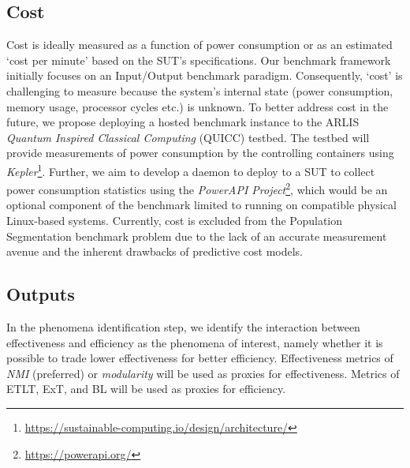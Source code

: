 \subsection{Cost}
Cost is ideally measured as a function of power consumption or as an estimated `cost per minute' based on the \ac{SUT}'s specifications.
Our \gai benchmark framework initially focuses on an Input/Output benchmark paradigm.
Consequently, `cost' is challenging to measure because the system's internal state (power consumption, memory usage, processor cycles etc.) is unknown.
To better address cost in the future, we propose deploying a hosted benchmark instance to the \ac{ARLIS} \textit{Quantum Inspired Classical Computing} (QUICC) testbed.
The testbed will provide measurements of power consumption by the controlling containers using \textit{Kepler}\footnote{{\scriptsize \url{https://sustainable-computing.io/design/architecture/}}}.
Further, we aim to develop a daemon to deploy to a \ac{SUT} to collect power consumption statistics using the \textit{PowerAPI Project}\footnote{{\scriptsize \url{https://powerapi.org/}}}, which would be an optional component of the benchmark limited to running on compatible physical Linux-based systems. 
Currently, cost is excluded from the Population Segmentation benchmark problem due to the lack of an accurate measurement avenue and the inherent drawbacks of predictive cost models.

\subsection{Outputs}
In the phenomena identification step, we identify the interaction between effectiveness and efficiency as the phenomena of interest, namely whether it is possible to trade lower effectiveness for better efficiency.
Effectiveness metrics of \textit{NMI} (preferred) or \textit{modularity} will be used as proxies for effectiveness. 
Metrics of \ac{ETLT}, \ac{ExT}, and \ac{BL} will be used as proxies for efficiency. 
